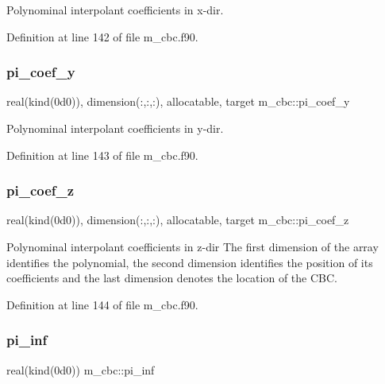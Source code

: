 Polynominal interpolant coefficients in x-\/dir. 



Definition at line 142 of file m\+\_\+cbc.\+f90.

\mbox{\label{namespacem__cbc_a54a6e22ead2511305b7370369f46af7a}} 
\subsubsection{\texorpdfstring{pi\+\_\+coef\+\_\+y}{pi\_coef\_y}}
{\footnotesize\ttfamily real(kind(0d0)), dimension(\+:,\+:,\+:), allocatable, target m\+\_\+cbc\+::pi\+\_\+coef\+\_\+y}



Polynominal interpolant coefficients in y-\/dir. 



Definition at line 143 of file m\+\_\+cbc.\+f90.

\mbox{\label{namespacem__cbc_af820095dcf800b727c19f2b5ee95a814}} 
\subsubsection{\texorpdfstring{pi\+\_\+coef\+\_\+z}{pi\_coef\_z}}
{\footnotesize\ttfamily real(kind(0d0)), dimension(\+:,\+:,\+:), allocatable, target m\+\_\+cbc\+::pi\+\_\+coef\+\_\+z}



Polynominal interpolant coefficients in z-\/dir The first dimension of the array identifies the polynomial, the second dimension identifies the position of its coefficients and the last dimension denotes the location of the C\+BC. 



Definition at line 144 of file m\+\_\+cbc.\+f90.

\mbox{\label{namespacem__cbc_a2187e55d648bf7c40be489b5a2b75ca7}} 
\subsubsection{\texorpdfstring{pi\+\_\+inf}{pi\_inf}}
{\footnotesize\ttfamily real(kind(0d0)) m\+\_\+cbc\+::pi\+\_\+inf}



